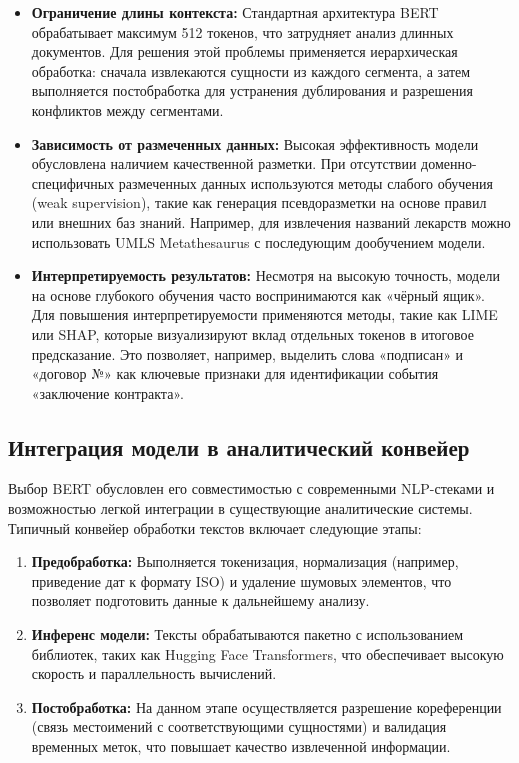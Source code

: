 \begin{itemize}
    \item \textbf{Ограничение длины контекста:}  
    Стандартная архитектура BERT обрабатывает максимум 512 токенов, что затрудняет анализ длинных документов. Для решения этой проблемы применяется иерархическая обработка: сначала извлекаются сущности из каждого сегмента, а затем выполняется постобработка для устранения дублирования и разрешения конфликтов между сегментами.

    \item \textbf{Зависимость от размеченных данных:}  
    Высокая эффективность модели обусловлена наличием качественной разметки. При отсутствии доменно-специфичных размеченных данных используются методы слабого обучения (weak supervision), такие как генерация псевдоразметки на основе правил или внешних баз знаний. Например, для извлечения названий лекарств можно использовать UMLS Metathesaurus с последующим дообучением модели.

    \item \textbf{Интерпретируемость результатов:}  
    Несмотря на высокую точность, модели на основе глубокого обучения часто воспринимаются как «чёрный ящик». Для повышения интерпретируемости применяются методы, такие как LIME или SHAP, которые визуализируют вклад отдельных токенов в итоговое предсказание. Это позволяет, например, выделить слова «подписан» и «договор №» как ключевые признаки для идентификации события «заключение контракта».
\end{itemize}

\subsection{Интеграция модели в аналитический конвейер}

Выбор BERT обусловлен его совместимостью с современными NLP-стеками и возможностью легкой интеграции в существующие аналитические системы. Типичный конвейер обработки текстов включает следующие этапы:

\begin{enumerate}
    \item \textbf{Предобработка:}  
    Выполняется токенизация, нормализация (например, приведение дат к формату ISO) и удаление шумовых элементов, что позволяет подготовить данные к дальнейшему анализу.

    \item \textbf{Инференс модели:}  
    Тексты обрабатываются пакетно с использованием библиотек, таких как Hugging Face Transformers, что обеспечивает высокую скорость и параллельность вычислений.

    \item \textbf{Постобработка:}  
    На данном этапе осуществляется разрешение кореференции (связь местоимений с соответствующими сущностями) и валидация временных меток, что повышает качество извлеченной информации.
\end{enumerate}

